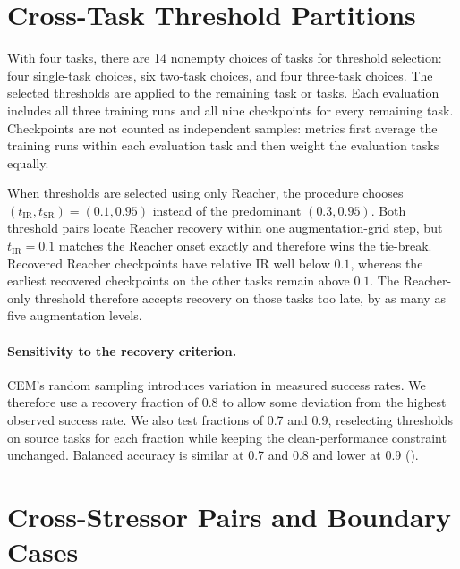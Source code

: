 \documentclass{article}
\begin{document}



\FloatBarrier
\section{Cross-Task Threshold Partitions}\label{sec:appendix-cross-task}

With four tasks, there are 14 nonempty choices of tasks for threshold
selection: four single-task choices, six two-task choices, and four three-task
choices. The selected thresholds are applied to the remaining task or tasks.
Each evaluation includes all three training runs and all nine checkpoints for
every remaining task. Checkpoints are not counted as independent samples:
metrics first average the training runs within each evaluation task and then
weight the evaluation tasks equally.

When thresholds are selected using only Reacher, the procedure chooses
$(t_{\mathrm{IR}},t_{\mathrm{SR}})=(0.1,0.95)$ instead of the predominant
$(0.3,0.95)$. Both threshold pairs locate Reacher recovery within one
augmentation-grid step, but $t_{\mathrm{IR}}=0.1$ matches the Reacher onset
exactly and therefore wins the tie-break. Recovered Reacher checkpoints have
relative IR well below $0.1$, whereas the earliest recovered checkpoints on
the other tasks remain above $0.1$. The Reacher-only threshold therefore
accepts recovery on those tasks too late, by as many as five augmentation
levels.



\paragraph{Sensitivity to the recovery criterion.}
CEM's random sampling introduces variation in measured success rates.
We therefore use a recovery fraction of 0.8 to allow some deviation from the
highest observed success rate. We also test fractions of 0.7 and 0.9,
reselecting thresholds on source tasks for each fraction while keeping the
clean-performance constraint unchanged. Balanced accuracy is similar at 0.7
and 0.8 and lower at 0.9 ().



\FloatBarrier
\section{Cross-Stressor Pairs and Boundary Cases}
\label{sec:appendix-cross-stressor}
\end{document}
